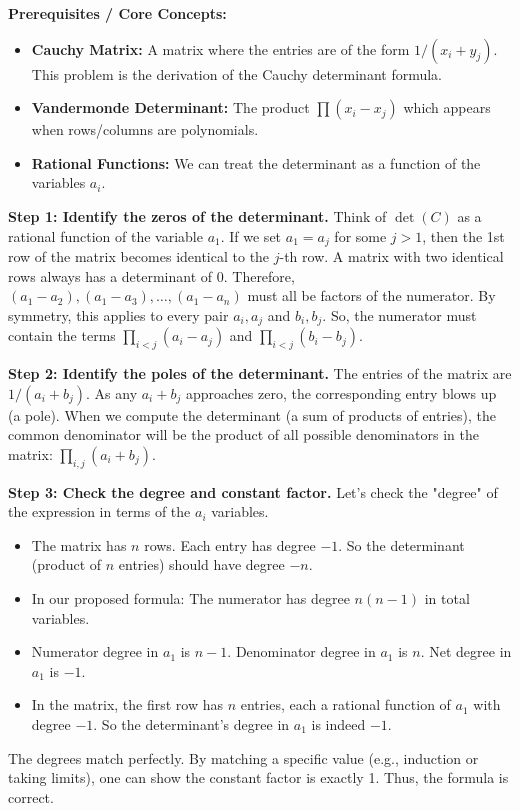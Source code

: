 \begin{solution}
\textbf{Prerequisites / Core Concepts:}
\begin{itemize}
    \item \textbf{Cauchy Matrix:} A matrix where the entries are of the form $1/(x_i + y_j)$. This problem is the derivation of the Cauchy determinant formula.
    \item \textbf{Vandermonde Determinant:} The product $\prod (x_i - x_j)$ which appears when rows/columns are polynomials.
    \item \textbf{Rational Functions:} We can treat the determinant as a function of the variables $a_i$.
\end{itemize}

\textbf{Step 1: Identify the zeros of the determinant.}
Think of $\det(C)$ as a rational function of the variable $a_1$. 
If we set $a_1 = a_j$ for some $j > 1$, then the 1st row of the matrix becomes identical to the $j$-th row. A matrix with two identical rows always has a determinant of 0.
Therefore, $(a_1 - a_2), (a_1 - a_3), \dots, (a_1 - a_n)$ must all be factors of the numerator.
By symmetry, this applies to every pair $a_i, a_j$ and $b_i, b_j$.
So, the numerator must contain the terms $\prod_{i < j} (a_i - a_j)$ and $\prod_{i < j} (b_i - b_j)$.

\textbf{Step 2: Identify the poles of the determinant.}
The entries of the matrix are $1/(a_i + b_j)$. As any $a_i + b_j$ approaches zero, the corresponding entry blows up (a pole).
When we compute the determinant (a sum of products of entries), the common denominator will be the product of all possible denominators in the matrix: $\prod_{i, j} (a_i + b_j)$.

\textbf{Step 3: Check the degree and constant factor.}
Let's check the "degree" of the expression in terms of the $a_i$ variables.
\begin{itemize}
    \item The matrix has $n$ rows. Each entry has degree $-1$. So the determinant (product of $n$ entries) should have degree $-n$.
    \item In our proposed formula: The numerator has degree $n(n-1)$ in total variables.
    \item Numerator degree in $a_1$ is $n-1$. Denominator degree in $a_1$ is $n$. Net degree in $a_1$ is $-1$.
    \item In the matrix, the first row has $n$ entries, each a rational function of $a_1$ with degree $-1$. So the determinant's degree in $a_1$ is indeed $-1$.
\end{itemize}
The degrees match perfectly. By matching a specific value (e.g., induction or taking limits), one can show the constant factor is exactly 1.
Thus, the formula is correct.
\end{solution}

